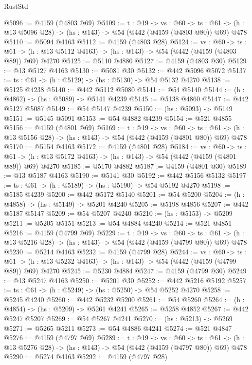 \begin{lexlean}{RustStd}
\begin{coremodule}
@5096 := @4159 (@4803 @69)
@5109 := {t : @19} ->
  {vs : @60} ->
  {ts : @61} -> (h : @13 @5096 @28) -> (hs : @143) -> @54 (@442 (@4159 (@4803 @80)) @69) @478
@5110 := @5094 @4163
@5112 := @4159 (@4803 @28)
@5124 := {vs : @60} ->
  {ts : @61} -> (h : @13 @5112 @4163) -> (hs : @143) -> @54 (@442 (@4159 (@4803 @89)) @69) @4270
@5125 := @5110 @4880
@5127 := @4159 (@4803 @30)
@5129 := @13 @5127 @4163
@5130 := @5081 @30
@5132 := @442 @5096 @5072
@5137 := {ts : @61} -> (h : @5129) -> (hs : @5130) -> @54 @5132 @4270
@5138 := @5125 @4238
@5140 := @442 @5112 @5080
@5141 := @54 @5140
@5144 := (h : @4862) -> (hs : @5089) -> @5141 @4239
@5145 := @5138 @4860
@5147 := @442 @5127 @5087
@5149 := @54 @5147 @4239
@5150 := (hs : @5093) -> @5149
@5151 := @5145 @5091
@5153 := @54 @4882 @4239
@5154 := @521 @4855
@5156 := @4159 (@4801 @69)
@5169 := {t : @19} ->
  {vs : @60} ->
  {ts : @61} -> (h : @13 @5156 @28) -> (hs : @143) -> @54 (@442 (@4159 (@4801 @80)) @69) @478
@5170 := @5154 @4163
@5172 := @4159 (@4801 @28)
@5184 := {vs : @60} ->
  {ts : @61} -> (h : @13 @5172 @4163) -> (hs : @143) -> @54 (@442 (@4159 (@4801 @89)) @69) @4270
@5185 := @5170 @4882
@5187 := @4159 (@4801 @30)
@5189 := @13 @5187 @4163
@5190 := @5141 @30
@5192 := @442 @5156 @5132
@5197 := {ts : @61} -> (h : @5189) -> (hs : @5190) -> @54 @5192 @4270
@5198 := @5185 @4239
@5200 := @442 @5172 @5140
@5201 := @54 @5200
@5204 := (h : @4858) -> (hs : @5149) -> @5201 @4240
@5205 := @5198 @4856
@5207 := @442 @5187 @5147
@5209 := @54 @5207 @4240
@5210 := (hs : @5153) -> @5209
@5211 := @5205 @5151
@5213 := @54 @4884 @4240
@5214 := @521 @4851
@5216 := @4159 (@4799 @69)
@5229 := {t : @19} ->
  {vs : @60} ->
  {ts : @61} -> (h : @13 @5216 @28) -> (hs : @143) -> @54 (@442 (@4159 (@4799 @80)) @69) @478
@5230 := @5214 @4163
@5232 := @4159 (@4799 @28)
@5244 := {vs : @60} ->
  {ts : @61} -> (h : @13 @5232 @4163) -> (hs : @143) -> @54 (@442 (@4159 (@4799 @89)) @69) @4270
@5245 := @5230 @4884
@5247 := @4159 (@4799 @30)
@5249 := @13 @5247 @4163
@5250 := @5201 @30
@5252 := @442 @5216 @5192
@5257 := {ts : @61} -> (h : @5249) -> (hs : @5250) -> @54 @5252 @4270
@5258 := @5245 @4240
@5260 := @442 @5232 @5200
@5261 := @54 @5260
@5264 := (h : @4854) -> (hs : @5209) -> @5261 @4241
@5265 := @5258 @4852
@5267 := @442 @5247 @5207
@5269 := @54 @5267 @4241
@5270 := (hs : @5213) -> @5269
@5271 := @5265 @5211
@5273 := @54 @4886 @4241
@5274 := @521 @4847
@5276 := @4159 (@4797 @69)
@5289 := {t : @19} ->
  {vs : @60} ->
  {ts : @61} -> (h : @13 @5276 @28) -> (hs : @143) -> @54 (@442 (@4159 (@4797 @80)) @69) @478
@5290 := @5274 @4163
@5292 := @4159 (@4797 @28)

\end{coremodule}
\end{lexlean}

